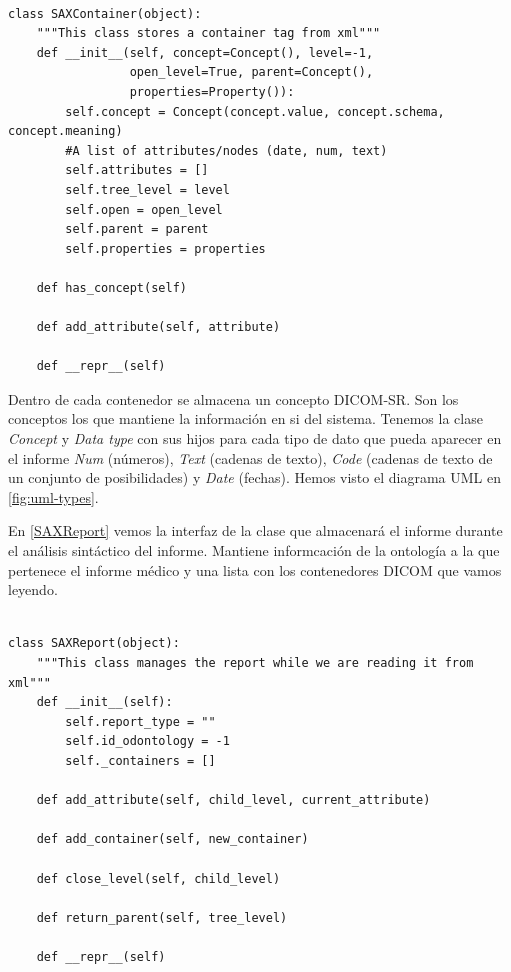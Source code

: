 \begin{lstlisting}[label=SAXContainer,caption=Clase que almacena información durante el análisis de un contenedor]

class SAXContainer(object):
    """This class stores a container tag from xml"""
    def __init__(self, concept=Concept(), level=-1, 
    			 open_level=True, parent=Concept(),
    			 properties=Property()):
        self.concept = Concept(concept.value, concept.schema, concept.meaning)
        #A list of attributes/nodes (date, num, text)
        self.attributes = []
        self.tree_level = level
        self.open = open_level
        self.parent = parent
        self.properties = properties

    def has_concept(self)

    def add_attribute(self, attribute)

	def __repr__(self)
\end{lstlisting}

Dentro de cada contenedor se almacena un concepto DICOM-SR. Son los conceptos los que mantiene la información en si del sistema. Tenemos la clase \emph{Concept} y \emph{Data type} con sus hijos para cada tipo de dato que pueda aparecer en el informe \emph{Num} (números), \emph{Text} (cadenas de texto), \emph{Code} (cadenas de texto de un conjunto de posibilidades) y \emph{Date} (fechas). Hemos visto el diagrama UML en \ref{fig:uml-types}.\medskip\par


En \ref{SAXReport} vemos la interfaz  de la clase que almacenará el informe durante el análisis sintáctico del informe. Mantiene informcación de la ontología a la que pertenece el informe médico y una lista con los contenedores DICOM que vamos leyendo.\par

\begin{lstlisting}[label=SAXReport,caption=Clase que almacena información durante el análisis de un informe]

class SAXReport(object):
    """This class manages the report while we are reading it from xml"""
    def __init__(self):
        self.report_type = ""
        self.id_odontology = -1
        self._containers = []

    def add_attribute(self, child_level, current_attribute)

    def add_container(self, new_container)

    def close_level(self, child_level)

    def return_parent(self, tree_level)
	
	def __repr__(self)
\end{lstlisting}

